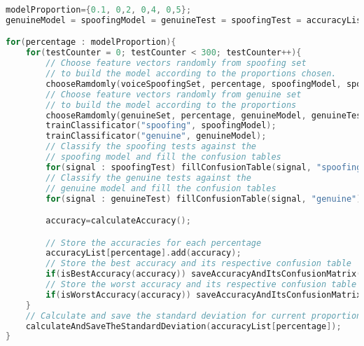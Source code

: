 \begin{lstlisting}[language=C++, caption={Procedure 3 algorithm}, label={lst:experiment03Algo}]
modelProportion={0.1, 0,2, 0,4, 0,5};
genuineModel = spoofingModel = genuineTest = spoofingTest = accuracyList = {};

for(percentage : modelProportion){
	for(testCounter = 0; testCounter < 300; testCounter++){
		// Choose feature vectors randomly from spoofing set
		// to build the model according to the proportions chosen.
		chooseRamdomly(voiceSpoofingSet, percentage, spoofingModel, spoofingTest);
		// Choose feature vectors randomly from genuine set
		// to build the model according to the proportions
		chooseRamdomly(genuineSet, percentage, genuineModel, genuineTest);
		trainClassificator("spoofing", spoofingModel);
		trainClassificator("genuine", genuineModel);
		// Classify the spoofing tests against the 
		// spoofing model and fill the confusion tables
		for(signal : spoofingTest) fillConfusionTable(signal, "spoofing"); 
		// Classify the genuine tests against the
		// genuine model and fill the confusion tables
		for(signal : genuineTest) fillConfusionTable(signal, "genuine");

		accuracy=calculateAccuracy();

		// Store the accuracies for each percentage
		accuracyList[percentage].add(accuracy);
		// Store the best accuracy and its respective confusion table
		if(isBestAccuracy(accuracy)) saveAccuracyAndItsConfusionMatrix();
		// Store the worst accuracy and its respective confusion table
		if(isWorstAccuracy(accuracy)) saveAccuracyAndItsConfusionMatrix();
	}
	// Calculate and save the standard deviation for current proportion
	calculateAndSaveTheStandardDeviation(accuracyList[percentage]);
}			
\end{lstlisting}